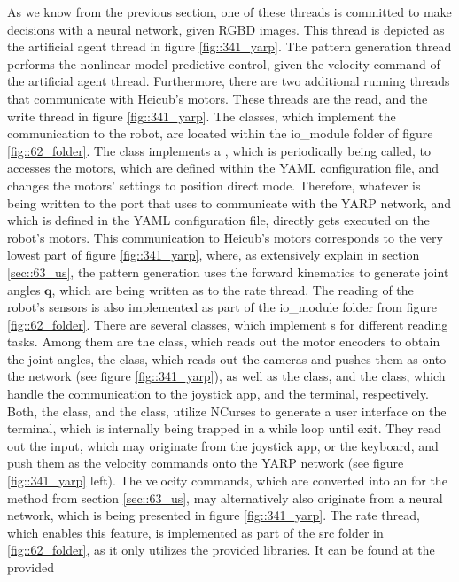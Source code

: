 As we know from the previous section, one of these threads is committed to make decisions with a neural network, given RGBD images. This thread is depicted as the artificial agent thread in figure \ref{fig::341_yarp}. The pattern generation thread performs the nonlinear model predictive control, given the velocity command of the artificial agent thread. Furthermore, there are two additional running threads that communicate with Heicub's motors. These threads are the read, and the write thread in figure \ref{fig::341_yarp}. The classes, which implement the communication to the robot, are located within the io\_module folder of figure \ref{fig::62_folder}. The  class implements a , which is periodically being called, to accesses the motors, which are defined within the YAML configuration file, and changes the motors' settings to position direct mode. Therefore, whatever is being written to the port that  uses to communicate with the YARP network, and which is defined in the YAML configuration file, directly gets executed on the robot's motors. This communication to Heicub's motors corresponds to the very lowest part of figure \ref{fig::341_yarp}, where, as extensively explain in section \ref{sec::63_us}, the pattern generation uses the forward kinematics to generate joint angles $\bm{q}$, which are being written as  to the  rate thread. The reading of the robot's sensors is also implemented as part of the io\_module folder from figure \ref{fig::62_folder}. There are several classes, which implement s for different reading tasks. Among them are the  class, which reads out the motor encoders to obtain the joint angles, the  class, which reads out the cameras and pushes them as  onto the network (see figure \ref{fig::341_yarp}), as well as the  class, and the  class, which handle the communication to the joystick app, and the terminal, respectively. Both, the  class, and the  class, utilize NCurses to generate a user interface on the terminal, which is internally being trapped in a while loop until exit. They read out the input, which may originate from the joystick app, or the keyboard, and push them as the velocity commands onto the YARP network (see figure \ref{fig::341_yarp} left). The velocity commands, which are converted into an  for the  method from section \ref{sec::63_us}, may alternatively also originate from a neural network, which is being presented in figure \ref{fig::341_yarp}. The  rate thread, which enables this feature, is implemented as part of the src folder in \ref{fig::62_folder}, as it only utilizes the provided libraries. It can be found at the provided 